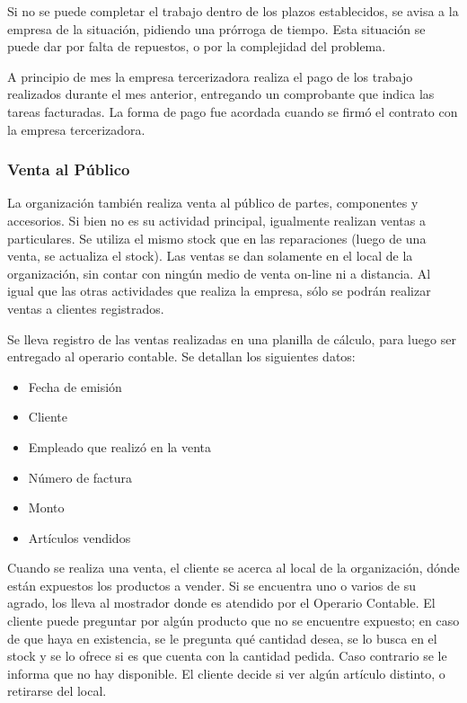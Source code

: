 \documentclass[12pt]{extarticle}
\begin{document}
\begin{spacing}{1.2}
    Si no se puede completar el trabajo dentro de los plazos establecidos, se avisa a la empresa de la situación, pidiendo una prórroga de tiempo. Esta situación se puede dar por falta de repuestos, o por la complejidad del problema.

    A principio de mes la empresa tercerizadora realiza el pago de los trabajo realizados durante el mes anterior, entregando un comprobante que indica las tareas facturadas. La forma de pago fue acordada cuando se firmó el contrato con la empresa tercerizadora.


    \subsubsection{Venta al Público}
    La organización también realiza venta al público de partes, componentes y accesorios. Si bien no es su actividad principal, igualmente realizan ventas a particulares. Se utiliza el mismo stock que en las reparaciones (luego de una venta, se actualiza el stock). 
    Las ventas se dan solamente en el local de la organización, sin contar con ningún medio de venta on-line ni a distancia. Al igual que las otras actividades que realiza la empresa, sólo se podrán realizar ventas a clientes registrados.

    Se lleva registro de las ventas realizadas en una planilla de cálculo, para luego ser entregado al operario contable. Se detallan los siguientes datos:
    \begin{itemize}
        \item Fecha de emisión
        \item Cliente
        \item Empleado que realizó en la venta
        \item Número de factura
        \item Monto
        \item Artículos vendidos
    \end{itemize}

    Cuando se realiza una venta, el cliente se acerca al local de la organización, dónde están expuestos los productos a vender. Si se encuentra uno o varios de su agrado, los lleva al mostrador donde es atendido por el Operario Contable. 
    El cliente puede preguntar por algún producto que no se encuentre expuesto; en caso de que haya en existencia, se le pregunta qué cantidad desea, se lo busca en el stock y se lo ofrece si es que cuenta con la cantidad pedida. Caso contrario se le informa que no hay disponible. El cliente decide si ver algún artículo distinto, o retirarse del local.


\end{spacing}
\end{document}
